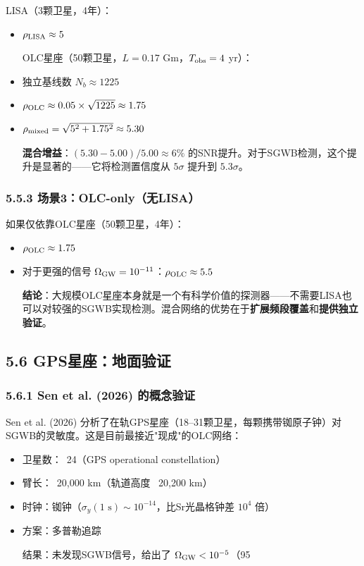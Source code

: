 \documentclass[12pt,a4paper]{article}
\begin{document}
LISA（3颗卫星，4年）：
\begin{itemize}
  \item $\rho_{\rm LISA} \approx 5$

OLC星座（50颗卫星，$L = 0.17$ Gm，$T_{\rm obs} = 4$ yr）：
  \item 独立基线数 $N_b \approx 1225$
  \item $\rho_{\rm OLC} \approx 0.05 \times \sqrt{1225} \approx 1.75$
  \item $\rho_{\rm mixed} = \sqrt{5^2 + 1.75^2} \approx 5.30$

\textbf{混合增益}：$(5.30 - 5.00)/5.00 \approx 6\%$ 的SNR提升。对于SGWB检测，这个提升是显著的——它将检测置信度从 $5\sigma$ 提升到 $5.3\sigma$。

\end{itemize}
\subsubsection{5.5.3 场景3：OLC-only（无LISA）}


如果仅依靠OLC星座（50颗卫星，4年）：
\begin{itemize}
  \item $\rho_{\rm OLC} \approx 1.75$
  \item 对于更强的信号 $\Omega_{\rm GW} = 10^{-11}$：$\rho_{\rm OLC} \approx 5.5$

\textbf{结论}：大规模OLC星座本身就是一个有科学价值的探测器——不需要LISA也可以对较强的SGWB实现检测。混合网络的优势在于\textbf{扩展频段覆盖}和\textbf{提供独立验证}。

\end{itemize}
\subsection{5.6 GPS星座：地面验证}


\subsubsection{5.6.1 Sen et al. (2026) 的概念验证}


Sen et al. (2026) 分析了在轨GPS星座（18–31颗卫星，每颗携带铷原子钟）对SGWB的灵敏度\cite{ref5}。这是目前最接近"现成"的OLC网络：

\begin{itemize}
  \item 卫星数：~24（GPS operational constellation）
  \item 臂长：~20,000 km（轨道高度 ~20,200 km）
  \item 时钟：铷钟（$\sigma_y(1\text{ s}) \sim 10^{-14}$，比Sr光晶格钟差 $10^4$ 倍）
  \item 方案：多普勒追踪

结果：未发现SGWB信号，给出了 $\Omega_{\rm GW} < 10^{-5}$（95%

\end{itemize}
\end{document}
